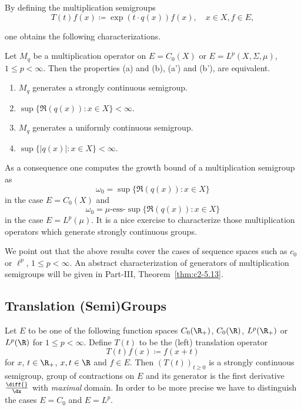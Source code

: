 By defining the multiplication semigroups
\[
    T(t)f(x) \coloneqq \exp(t \cdot q(x))f(x), \quad x \in X, f \in E,
\]

one obtains the following characterizations.
\begin{proposition*}\label{prop:a1-2.3}
Let $M_{q}$ be a multiplication operator on $E = C_{0}(X)$ or $E = L^{p}(X,\Sigma,\mu)$, $1 \leq p < \infty$.
Then the properties \upshape(a) and \upshape(b), \resp \upshape(a') and \upshape(b'), are equivalent.
\begin{enumerate}[labelwidth=2em, labelsep=0.5em, leftmargin=3em, align=left]
\item[\upshape (a)] 
	$M_{q}$ generates a strongly continuous semigroup.

\item[\upshape (b)]
	$\sup\{\Re(q(x)) \colon x \in X \} < \infty$.

\item[\upshape(a')] 
	$M_{q}$ generates a uniformly continuous semigroup.

\item[\upshape(b')] 
	$\sup\{|q(x)| \colon x \in X \} < \infty$.
\end{enumerate}
\end{proposition*}
As a consequence one computes the growth bound of a multiplication semigroup as
\[
    \omega_{0} = \sup\{\Re(q(x)) \colon x \in X\} 
\]
in the case $E = C_{0}(X)$ and 
\[
    \omega_{0} = \mu\text{-ess-}\sup\{\Re(q(x)) \colon x \in X\} 
\]
in the case  $E = L^{p}(\mu)$.
It is a nice exercise to characterize those multiplication operators which generate strongly continuous groups.

We point out that the above results cover the cases of sequence spaces such as $c_{0}$ or $\ell^{p}$, $1 \leq p < \infty$.
An abstract characterization of generators of multiplication semigroups will be given in Part-III, Theorem~\ref{thm:c2-5.13}.
\subsection{Translation (Semi)Groups}\label{subsec:a1-2.4}%
Let $E$ to be one of the following function spaces $C_{0}(\R_{+})$, $C_{0}(\R)$, $L^{p}(\R_{+})$ or $L^{p}(\R)$ for $1 \leq p < \infty$.
Define $T(t)$ to be the (left) translation operator
\[
    T(t)f(x) \coloneqq f(x+t)
\]
for $x$, $ t \in \R_{+}$, \resp $x, t \in \R$ and $f \in E$.
Then $(T(t))_{t \geq 0}$ is a strongly continuous semigroup, \resp group of contractions on $E$ and its generator is the first derivative $\frac{\diff{}}{\dx}$ with \emph{maximal} domain.
In order to be more precise we have to distinguish the cases $E = C_{0}$ and $E = L^{p}$.


